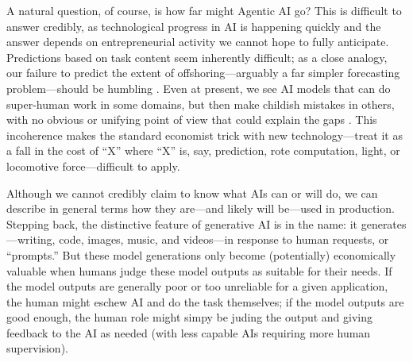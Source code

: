 \documentclass{article}
\theoremstyle{plain}
\theoremstyle{plain}
\begin{document}

A natural question, of course, is how far might Agentic AI go?
This is difficult to answer credibly, as technological progress in AI is happening quickly and the answer depends on entrepreneurial activity we cannot hope to fully anticipate.
Predictions based on task content seem inherently difficult; as a close analogy, our failure to predict the extent of offshoring---arguably a far simpler forecasting problem---should be humbling \citep{ozimek2019overboard}.
Even at present, we see AI models that can do super-human work in some domains, but then make childish mistakes in others, with no obvious or unifying point of view that could explain the gaps \citep{vafa2024large}.
This incoherence makes the standard economist trick with new technology---treat it as a fall in the cost of ``X'' where ``X'' is, say, prediction, rote computation, light, or locomotive force---difficult to apply.

Although we cannot credibly claim to know what AIs can or will do, we can describe in general terms how they are---and likely will be---used in production.
Stepping back, the distinctive feature of generative AI is in the name: it generates---writing, code, images, music, and videos---in response to human requests, or ``prompts.''
But these model generations only become (potentially) economically valuable when humans judge these model outputs as suitable for their needs.
If the model outputs are generally poor or too unreliable for a given application, the human might eschew AI and do the task themselves; if the model outputs are good enough, the human role might simpy be juding the output and giving feedback to the AI as needed (with less capable AIs requiring more human supervision).
\end{document}
